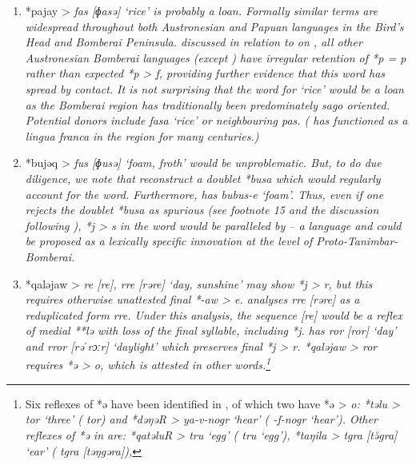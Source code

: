 \begin{enumerate}
	\item	*pajay > \it{fas} [ɸasə] ‘rice’ is probably a loan.
				Formally similar terms are widespread throughout both Austronesian
				and Papuan languages in the Bird’s Head and Bomberai Peninsula.
				 discussed in relation to  on ,
				all other Austronesian Bomberai languages (except )
				have irregular retention of *p = \it{p} rather than expected
				*p > \it{f}, providing further evidence that this word has spread by contact.
				It is not surprising that the word for ‘rice’ would be a loan
				as the Bomberai region has traditionally been predominately sago oriented.
				Potential donors include  \it{fasa} ‘rice’ or neighbouring  \it{pas}.
				( has functioned as a lingua franca in the region for many
				centuries.) \item	*bujəq > \it{fus} [ɸusə] ‘foam,
				froth’ would be unproblematic.
				But, to do due diligence,
				we note that \citet{BlustTrussel2020} reconstruct a doublet *busa
				which would regularly account for the  word.
				Furthermore,  has \it{bu{\tl}bus-e} ‘foam’.
				Thus, even if one rejects the doublet *busa as spurious (see
				footnote 15 and the discussion following ),
				*j > \it{s} in the  word would be paralleled by  -- a
				 language and could be proposed as a lexically specific innovation at the level of Proto-Tanimbar-Bomberai.
	\item	*qaləjaw >  \it{re} [re],
				\it{rre} [rəre] ‘day, sunshine’ may show *j > \it{r}, but this
				requires otherwise unattested final *-aw > \it{e}.
				\citet[262]{Jackson2014} analyses \it{rre} [rəre] as a reduplicated form \it{r{\tl}re}.
				Under this analysis, the sequence [re] would be a reflex of medial
				**lə with loss of the final syllable, including *j.
				 has \it{ror} [ror] ‘day’
				and \it{rror} [rəˈrɔːr] ‘daylight’ which preserves final *j > \it{r}.
				*qaləjaw >  \it{ror} requires *ə > \it{o},
				which is attested in other words.\footnote{
						Six reflexes of *ə
						have been identified in ,
						of which two have *ə > \it{o}: *təlu > \it{tor} ‘three’ (
						\it{tor}) and *dəŋəR > \it{ya-v-nogr} ‘hear’ ( \it{-f-nogr} ‘hear’).
						Other reflexes of *ə in  are: *qatəluR > \it{tru} ‘egg’ (
						\it{tru} ‘egg’), *taŋila > \it{tgra} [tə̆gra] ‘ear’ ( \it{tgra} [təŋgəra]),
}
\end{enumerate}
